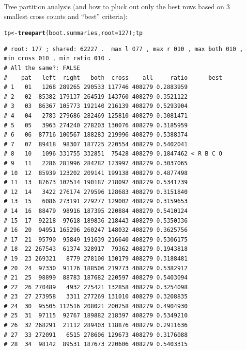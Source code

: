 \documentclass{article}\usepackage[]{graphicx}\usepackage[]{color}
\makeatletter
\newcommand{\hlnum}[1]{\textcolor[rgb]{0.686,0.059,0.569}{#1}}%
\newcommand{\hlstd}[1]{\textcolor[rgb]{0.345,0.345,0.345}{#1}}%
\newcommand{\hlkwb}[1]{\textcolor[rgb]{0.69,0.353,0.396}{#1}}%
\newcommand{\hlkwc}[1]{\textcolor[rgb]{0.333,0.667,0.333}{#1}}%
\newcommand{\hlkwd}[1]{\textcolor[rgb]{0.737,0.353,0.396}{\textbf{#1}}}%
\newenvironment{kframe}{%
 \def\at@end@of@kframe{}%
 \ifinner\ifhmode%
  \def\at@end@of@kframe{\end{minipage}}%
  \begin{minipage}{\columnwidth}%
 \fi\fi%
 \def\FrameCommand##1{\hskip\@totalleftmargin \hskip-\fboxsep
 \colorbox{shadecolor}{##1}\hskip-\fboxsep
     \hskip-\linewidth \hskip-\@totalleftmargin \hskip\columnwidth}%
 \MakeFramed {\advance\hsize-\width
   \@totalleftmargin\z@ \linewidth\hsize
   \@setminipage}}%
 {\par\unskip\endMakeFramed%
 \at@end@of@kframe}
\newenvironment{knitrout}{}{} %
\makeatother
\begin{document}
Tree partition analysis (and how to pluck out only the best rows based on 3 smallest cross counts and ``best'' criteria):

\begin{knitrout}\scriptsize
{}\color{fgcolor}\begin{kframe}
\begin{alltt}
\hlstd{tp} \hlkwb{<-} \hlkwd{treepart}\hlstd{(boot.summaries,}\hlkwc{root}\hlstd{=}\hlnum{127}\hlstd{) ; tp}
\end{alltt}
\begin{verbatim}
# root: 177 ; shared: 62227 .  max l 077 , max r 010 , max both 010 , min cross 010 , min ratio 010 . 
# All the same?: FALSE
#    pat   left  right   both  cross    all     ratio      best
# 1   01   1268 289265 290533 117746 408279 0.2883959          
# 2   02  85382 179137 264519 143760 408279 0.3521122          
# 3   03  86367 105773 192140 216139 408279 0.5293904          
# 4   04   2783 279686 282469 125810 408279 0.3081471          
# 5   05   3963 274240 278203 130076 408279 0.3185959          
# 6   06  87716 100567 188283 219996 408279 0.5388374          
# 7   07  89418  98307 187725 220554 408279 0.5402041          
# 8   10   1096 331755 332851  75428 408279 0.1847462 < R B C O
# 9   11   2286 281996 284282 123997 408279 0.3037065          
# 10  12  85939 123202 209141 199138 408279 0.4877498          
# 11  13  87673 102514 190187 218092 408279 0.5341739          
# 12  14   3422 276174 279596 128683 408279 0.3151840          
# 13  15   6086 273191 279277 129002 408279 0.3159653          
# 14  16  88479  98916 187395 220884 408279 0.5410124          
# 15  17  92218  97618 189836 218443 408279 0.5350336          
# 16  20  94951 165296 260247 148032 408279 0.3625756          
# 17  21  95790  95849 191639 216640 408279 0.5306175          
# 18  22 267543  61374 328917  79362 408279 0.1943818          
# 19  23 269321   8779 278100 130179 408279 0.3188481          
# 20  24  97330  91176 188506 219773 408279 0.5382912          
# 21  25  98899  88783 187682 220597 408279 0.5403094          
# 22  26 270489   4932 275421 132858 408279 0.3254098          
# 23  27 273958   3311 277269 131010 408279 0.3208835          
# 24  30  95505 112516 208021 200258 408279 0.4904930          
# 25  31  97115  92767 189882 218397 408279 0.5349210          
# 26  32 268291  21112 289403 118876 408279 0.2911636          
# 27  33 272091   6515 278606 129673 408279 0.3176088          
# 28  34  98142  89531 187673 220606 408279 0.5403315          

\end{verbatim}
\end{kframe}
\end{knitrout}
\end{document}
